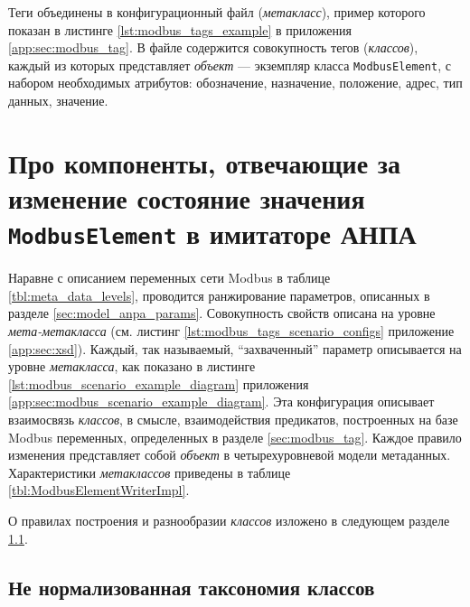 Теги объединены в конфигурационный файл (\textit{метакласс}), пример которого показан 
в листинге \ref{lst:modbus_tags_example} в приложения \ref{app:sec:modbus_tag}.
В файле содержится совокупность тегов (\textit{классов}),
каждый из которых представляет \textit{объект} --- экземпляр класса \texttt{ModbusElement},
с набором необходимых атрибутов: обозначение, назначение, положение, адрес, тип данных, значение.


\section{Про компоненты, отвечающие за изменение состояние значения \texttt{ModbusElement} в имитаторе АНПА}\label{sec:writers_def}

Наравне с описанием переменных сети Modbus в таблице \ref{tbl:meta_data_levels},
проводится ранжирование параметров, описанных в разделе \ref{sec:model_anpa_params}.
Совокупность свойств описана на уровне \textit{мета-метакласса} (см. листинг \ref{lst:modbus_tags_scenario_configs} приложение \ref{app:sec:xsd}).
Каждый, так называемый, ``захваченный'' параметр описывается на уровне \textit{метакласса},
как показано в листинге \ref{lst:modbus_scenario_example_diagram} приложения \ref{app:sec:modbus_scenario_example_diagram}.
%
Эта конфигурация описывает взаимосвязь \textit{классов}, в смысле, взаимодействия предикатов, построенных на базе 
Modbus переменных, определенных в разделе \ref{sec:modbus_tag}.
Каждое правило изменения представляет собой \textit{объект} в четырехуровневой модели метаданных.
Характеристики \textit{метаклассов} приведены в таблице \ref{tbl:ModbusElementWriterImpl}.

О правилах построения и разнообразии \textit{классов} изложено в следующем разделе \ref{sec:writers_relationship}.


\subsection{Не нормализованная таксономия классов}
    \label{sec:writers_relationship}


